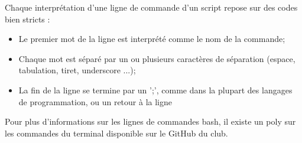 Chaque interprétation d'une ligne de commande d'un script repose sur des codes bien stricts :
\begin{itemize}
  \item Le premier mot de la ligne est interprété comme le nom de la commande;
  \item Chaque mot est séparé par un ou plusieurs caractères de séparation (espace, tabulation, tiret, underscore ...);
  \item La fin de la ligne se termine par un ';', comme dans la plupart des langages de programmation, ou un retour à la ligne
\end{itemize}


Pour plus d'informations sur les lignes de commandes bash, il existe un poly sur les commandes du terminal disponible sur le GitHub du club.

